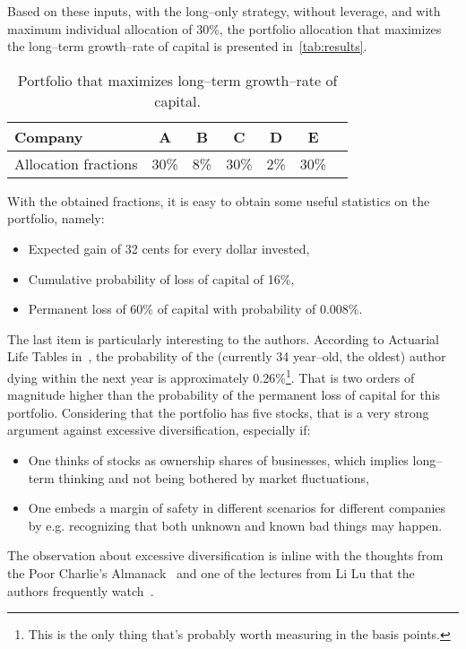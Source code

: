 \documentclass{article}
\begin{document}
\noindent Based on these inputs, with the long--only strategy, without leverage,
and with maximum individual allocation of 30\%, the portfolio allocation that
maximizes the long--term growth--rate of capital is presented
in~\autoref{tab:results}.

\begin{table}
\caption{Portfolio that maximizes long--term growth--rate of capital.}
\vspace{0.25cm}
\centering
\begin{tabular}{l|c|c|c|c|c|c}
Company & A & B & C & D & E \\
\hline
Allocation fractions & 30\% & 8\% & 30\% & 2\% & 30\% \\
\end{tabular}%
\label{tab:results}%
\end{table}%

With the obtained fractions, it is easy to obtain some useful
statistics on the portfolio, namely:
\begin{itemize}
    \item Expected gain of 32 cents for every dollar invested,
    \item Cumulative probability of loss of capital of 16\%,
    \item Permanent loss of 60\% of capital with probability of 0.008\%.
\end{itemize}

\noindent The last item is particularly interesting to the authors. According to
Actuarial Life Tables in~\cite{lifeTables}, the probability of the (currently 34
year--old, the oldest) author dying within the next year is approximately
0.26\%\footnote{This is the only thing that's probably worth measuring in the
basis points.}. That is two orders of magnitude higher than the probability of
the permanent loss of capital for this portfolio. Considering that the portfolio
has five stocks, that is a very strong argument against excessive
diversification, especially if:
\begin{itemize}
    \item One thinks of stocks as ownership shares of businesses, which implies
    long--term thinking and not being bothered by market fluctuations, 
    \item One embeds a margin of safety in different scenarios for different
    companies by e.g. recognizing that both unknown and known bad things may
    happen.
\end{itemize}

\noindent The observation about excessive diversification is inline with the
thoughts from the Poor Charlie's Almanack~\cite{almanack} and one of the
lectures from Li Lu that the authors frequently watch~\cite{liLuLecture}.
\end{document}
